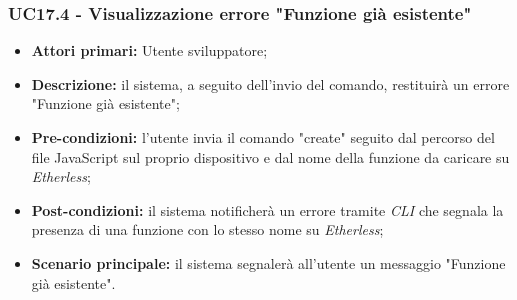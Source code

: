 \subsubsection{UC17.4 - Visualizzazione errore "Funzione già esistente"}
\begin{itemize}
	\item \textbf{Attori primari:} Utente sviluppatore;
	\item \textbf{Descrizione:} il sistema, a seguito dell'invio del comando, restituirà un errore "Funzione già esistente";
	\item \textbf{Pre-condizioni:}  l'utente invia il comando "create" seguito dal percorso del file JavaScript sul proprio dispositivo e dal nome della funzione da caricare su \textit{Etherless};
	\item \textbf{Post-condizioni:} il sistema notificherà un errore tramite \textit{CLI\glo} che segnala la presenza di una funzione con lo stesso nome su \textit{Etherless};
	\item \textbf{Scenario principale:} il sistema segnalerà all'utente un messaggio "Funzione già esistente".
\end{itemize}